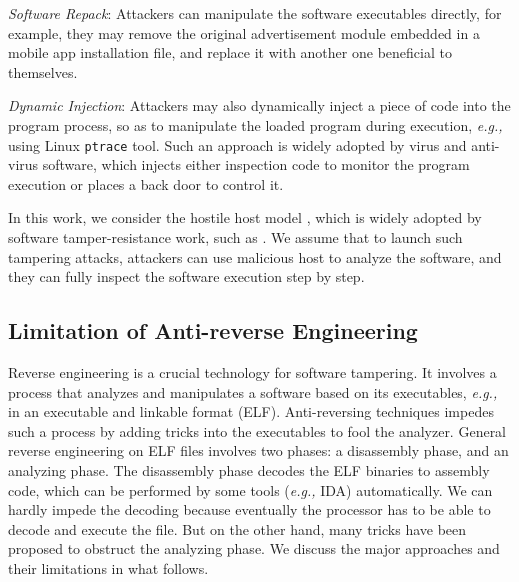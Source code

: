 \documentclass[10pt, conference]{IEEEtran}
\begin{document}
\textit{Software Repack}: Attackers can manipulate the software executables directly, for example, they may remove the original advertisement module embedded in a mobile app installation file, and replace it with another one beneficial to themselves.

\textit{Dynamic Injection}: Attackers may also dynamically inject a piece of code into the program process, so as to manipulate the loaded program during execution, \textit{e.g.,} using Linux \texttt{ptrace} tool.  Such an approach is widely adopted by virus and anti-virus software, which injects either inspection code to monitor the program execution or places a back door to control it.

In this work, we consider the hostile host model \cite{sander1998protecting}, which is widely adopted by software tamper-resistance work, such as \cite{horne2002dynamic,collberg2002watermarking}.  We assume that to launch such tampering attacks, attackers can use malicious host to analyze the software, and they can fully inspect the software execution step by step.

\subsection{Limitation of Anti-reverse Engineering} \label{section:threat}

Reverse engineering is a crucial technology for software tampering.  It involves a process that analyzes and manipulates a software based on its executables, \textit{e.g.,} in an executable and linkable format (ELF).  Anti-reversing techniques impedes such a process by adding tricks into the executables to fool the analyzer.  General reverse engineering on ELF files involves two phases: a disassembly phase, and an analyzing phase.  The disassembly phase decodes the ELF binaries to assembly code, which can be performed by some tools (\textit{e.g.,} IDA) automatically.  We can hardly impede the decoding because eventually the processor has to be able to decode and execute the file.  But on the other hand, many tricks have been proposed to obstruct the analyzing phase.  We discuss the major approaches and their limitations in what follows.
\end{document}
